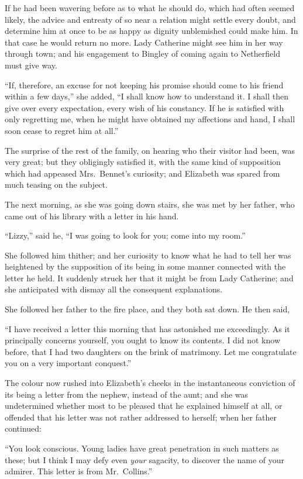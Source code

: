 \documentclass[12pt,english,oneside]{book}
\begin{document}
If he had been wavering before as to what he should do, which had
often seemed likely, the advice and entreaty of so near a relation
might settle every doubt, and determine him at once to be as happy
as dignity unblemished could make him. In that case he would return
no more. Lady Catherine might see him in her way through town; and
his engagement to Bingley of coming again to Netherfield must give
way.

{}``If, therefore, an excuse for not keeping his promise should come
to his friend within a few days,'' she added, {}``I shall know how
to understand it. I shall then give over every expectation, every
wish of his constancy. If he is satisfied with only regretting me,
when he might have obtained my affections and hand, I shall soon cease
to regret him at all.''

\bigskip{} The surprise of the rest of the family, on hearing who
their visitor had been, was very great; but they obligingly satisfied
it, with the same kind of supposition which had appeased Mrs.\ Bennet's
curiosity; and Elizabeth was spared from much teasing on the subject.

The next morning, as she was going down stairs, she was met by her
father, who came out of his library with a letter in his hand.

{}``Lizzy,'' said he, {}``I was going to look for you; come into
my room.''

She followed him thither; and her curiosity to know what he had to
tell her was heightened by the supposition of its being in some manner
connected with the letter he held. It suddenly struck her that it
might be from Lady Catherine; and she anticipated with dismay all
the consequent explanations.

She followed her father to the fire place, and they both sat down.
He then said,

{}``I have received a letter this morning that has astonished me
exceedingly. As it principally concerns yourself, you ought to know
its contents. I did not know before, that I had two daughters on the
brink of matrimony. Let me congratulate you on a very important conquest.''

The colour now rushed into Elizabeth's cheeks in the instantaneous
conviction of its being a letter from the nephew, instead of the aunt;
and she was undetermined whether most to be pleased that he explained
himself at all, or offended that his letter was not rather addressed
to herself; when her father continued:

{}``You look conscious. Young ladies have great penetration in such
matters as these; but I think I may defy even \textit{your} sagacity,
to discover the name of your admirer. This letter is from Mr.\ Collins.''
\end{document}
